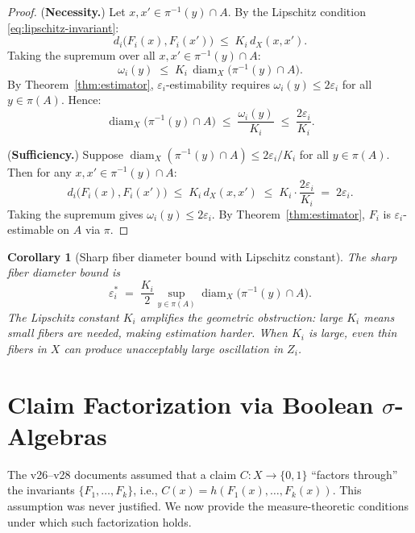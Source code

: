 \documentclass[11pt]{article}
\newtheorem{corollary}{Corollary}
\begin{document}
\begin{proof}
(\textbf{Necessity.}) Let $x,x'\in\pi^{-1}(y)\cap A$. By the Lipschitz condition \eqref{eq:lipschitz-invariant}:
\[
d_i\bigl(F_i(x),F_i(x')\bigr)\;\leq\;K_i\,d_X(x,x').
\]
Taking the supremum over all $x,x'\in\pi^{-1}(y)\cap A$:
\[
\omega_i(y)\;\leq\;K_i\,\operatorname{diam}_X\!\bigl(\pi^{-1}(y)\cap A\bigr).
\]
By Theorem~\ref{thm:estimator}, $\varepsilon_i$-estimability requires $\omega_i(y)\leq 2\varepsilon_i$ for all $y\in\pi(A)$. Hence:
\[
\operatorname{diam}_X\!\bigl(\pi^{-1}(y)\cap A\bigr)\;\leq\;\frac{\omega_i(y)}{K_i}\;\leq\;\frac{2\varepsilon_i}{K_i}.
\]

\medskip\noindent(\textbf{Sufficiency.}) Suppose $\operatorname{diam}_X(\pi^{-1}(y)\cap A)\leq 2\varepsilon_i/K_i$ for all $y\in\pi(A)$. Then for any $x,x'\in\pi^{-1}(y)\cap A$:
\[
d_i\bigl(F_i(x),F_i(x')\bigr)\;\leq\;K_i\,d_X(x,x')\;\leq\;K_i\cdot\frac{2\varepsilon_i}{K_i}\;=\;2\varepsilon_i.
\]
Taking the supremum gives $\omega_i(y)\leq 2\varepsilon_i$. By Theorem~\ref{thm:estimator}, $F_i$ is $\varepsilon_i$-estimable on $A$ via $\pi$.
\end{proof}

\begin{corollary}[Sharp fiber diameter bound with Lipschitz constant]\label{cor:sharp-fiber}
The sharp fiber diameter bound is
\begin{equation}\label{eq:sharp-fiber}
\varepsilon_i^{*}\;=\;\frac{K_i}{2}\sup_{y\in\pi(A)}\operatorname{diam}_X\!\bigl(\pi^{-1}(y)\cap A\bigr).
\end{equation}
The Lipschitz constant $K_i$ amplifies the geometric obstruction: large $K_i$ means small fibers are needed, making estimation harder. When $K_i$ is large, even thin fibers in $X$ can produce unacceptably large oscillation in $Z_i$.
\end{corollary}

\section{Claim Factorization via Boolean \texorpdfstring{$\sigma$}{sigma}-Algebras}
\label{sec:factorization}

The v26--v28 documents assumed that a claim $C\colon X\to\{0,1\}$ ``factors through'' the invariants $\{F_1,\ldots,F_k\}$, i.e., $C(x)=h(F_1(x),\ldots,F_k(x))$. This assumption was never justified. We now provide the measure-theoretic conditions under which such factorization holds.
\end{document}
